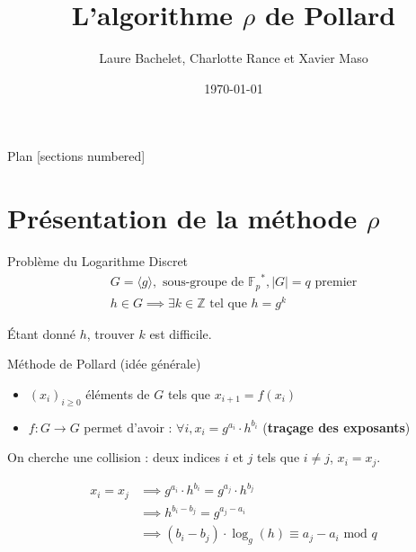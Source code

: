 \documentclass{beamer}
\title{L'algorithme $\rho$ de Pollard}
\date{\today}
\author{Laure Bachelet, Charlotte Rance et Xavier Maso}
\institute{Master CSI, Université de Bordeaux}
\begin{document}
  \maketitle

  \begin{frame}{Plan}
    [sections numbered]
    \tableofcontents[hideallsubsections]
  \end{frame}


  \section{Présentation de la méthode $\rho$}

  \begin{frame}{Problème du Logarithme Discret}
    \begin{align*}
      G = \langle g \rangle, \text{\ sous-groupe de }{\mathbb{F}_p}^*, |G| = q \text{\ premier} \\
      h \in G \implies \exists k \in \mathbb{Z} \text{\ tel que } h = g^k
    \end{align*}

    Étant donné $h$, trouver $k$ est difficile.
  \end{frame}


  \begin{frame}{Méthode de Pollard (idée générale)}
    \begin{itemize}
      \item $(x_i)_{i \ge 0}$ éléments de $G$ tels que $x_{i+1} = f(x_i)$
      \item $f: G \rightarrow G$ permet d'avoir : $\forall i, x_i = g^{a_i} \cdot h^{b_i}$ (\textbf{traçage des exposants})
    \end{itemize}


    On cherche une collision : deux indices $i$ et $j$ tels que $i \ne j$, $x_i = x_j$.

    \begin{align*}
       x_i = x_j &\implies g^{a_i} \cdot h^{b_i} = g^{a_j} \cdot h^{b_j} \\
                 &\implies h^{b_i - b_j} = g^{a_j - a_i} \\
                 &\implies (b_i - b_j) \cdot \log_g(h) \equiv a_j - a_i \text{\ mod } q
     \end{align*}
  \end{frame}
\end{document}
